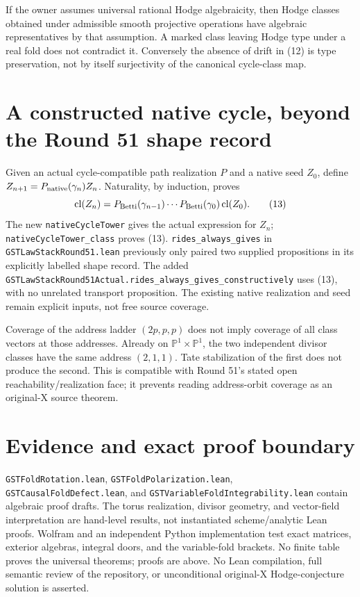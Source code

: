 \documentclass[11pt]{article}
\begin{document}
If the owner assumes universal rational Hodge algebraicity, then
Hodge classes obtained under admissible smooth projective operations
have algebraic representatives by that assumption. A marked class
leaving Hodge type under a real fold does not contradict it. Conversely
the absence of drift in (12) is type preservation, not by itself
surjectivity of the canonical cycle-class map.

\section{A constructed native cycle, beyond the Round 51 shape record}
Given an actual cycle-compatible path realization $P$ and a native seed
$Z_0$, define $Z_{n+1}=P_{\rm native}(\gamma_n)Z_n$.
Naturality, by induction, proves
\[
 \operatorname{cl}(Z_n)=P_{\rm Betti}(\gamma_{n-1})\cdots
       P_{\rm Betti}(\gamma_0)\operatorname{cl}(Z_0).       \tag{13}
\]
The new \texttt{nativeCycleTower} gives the actual expression for $Z_n$;
\texttt{nativeCycleTower\_class} proves (13).
\texttt{rides\_always\_gives} in \texttt{GSTLawStackRound51.lean} previously only paired
two supplied propositions in its explicitly labelled shape record.
The added \texttt{GSTLawStackRound51Actual.rides\_always\_gives\_constructively}
uses (13), with no unrelated transport proposition. The existing native
realization and seed remain explicit inputs, not free source coverage.

Coverage of the address ladder $(2p,p,p)$ does not imply coverage of all
class vectors at those addresses. Already on $\mathbb P^1\times\mathbb P^1$,
the two independent divisor classes have the same address $(2,1,1)$.
Tate stabilization of the first does not produce the second. This is
compatible with Round 51's stated open reachability/realization face;
it prevents reading address-orbit coverage as an original-X source theorem.

\section{Evidence and exact proof boundary}
\texttt{GSTFoldRotation.lean}, \texttt{GSTFoldPolarization.lean},
\texttt{GSTCausalFoldDefect.lean}, and
\texttt{GSTVariableFoldIntegrability.lean} contain algebraic proof drafts.
The torus realization, divisor geometry, and vector-field interpretation
are hand-level results, not instantiated scheme/analytic Lean proofs.
Wolfram and an independent Python implementation test exact matrices,
exterior algebras, integral doors, and the variable-fold brackets.
No finite table proves the universal theorems; proofs are above.
No Lean compilation, full semantic review of the repository, or
unconditional original-X Hodge-conjecture solution is asserted.
\end{document}
